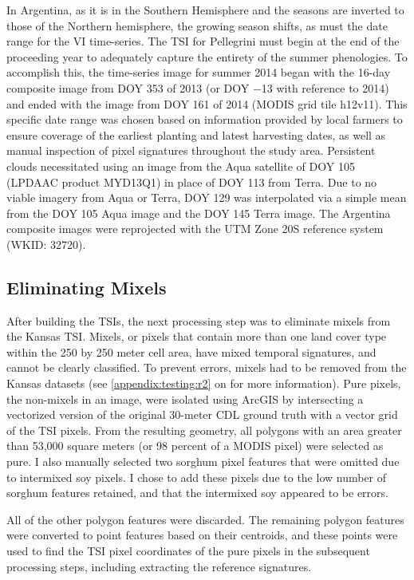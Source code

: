 In Argentina, as it is in the Southern Hemisphere and the seasons are inverted to those of the Northern hemisphere, the growing season shifts, as must the date range for the VI time-series. The TSI for Pellegrini must begin at the end of the proceeding year to adequately capture the entirety of the summer phenologies. To accomplish this, the time-series image for summer 2014 began with the 16-day composite image from DOY 353 of 2013 (or DOY −13 with reference to 2014) and ended with the image from DOY 161 of 2014 (MODIS grid tile h12v11). This specific date range was chosen based on information provided by local farmers to ensure coverage of the earliest planting and latest harvesting dates, as well as manual inspection of pixel signatures throughout the study area. Persistent clouds necessitated using an image from the Aqua satellite of DOY 105 (LPDAAC product MYD13Q1) in place of DOY 113 from Terra. Due to no viable imagery from Aqua or Terra, DOY 129 was interpolated via a simple mean from the DOY 105 Aqua image and the DOY 145 Terra image. The Argentina composite images were reprojected with the UTM Zone 20S reference system (WKID: 32720).

\subsection{Eliminating Mixels}
\label{methods:mixels}

After building the TSIs, the next processing step was to eliminate mixels from the Kansas TSI. Mixels, or pixels that contain more than one land cover type within the 250 by 250 meter cell area, have mixed temporal signatures, and cannot be clearly classified. To prevent errors, mixels had to be removed from the Kansas datasets (see \autoref{appendix:testing:r2} on  for more information). Pure pixels, the non-mixels in an image, were isolated using ArcGIS \autocite{arcgis10.1} by intersecting a vectorized version of the original 30-meter CDL ground truth with a vector grid of the TSI pixels. From the resulting geometry, all polygons with an area greater than 53,000 square meters (or 98 percent of a MODIS pixel) were selected as pure. I also manually selected two sorghum pixel features that were omitted due to intermixed soy pixels. I chose to add these pixels due to the low number of sorghum features retained, and that the intermixed soy appeared to be errors.

All of the other polygon features were discarded. The remaining polygon features were converted to point features based on their centroids, and these points were used to find the TSI pixel coordinates of the pure pixels in the subsequent processing steps, including extracting the reference signatures. 

